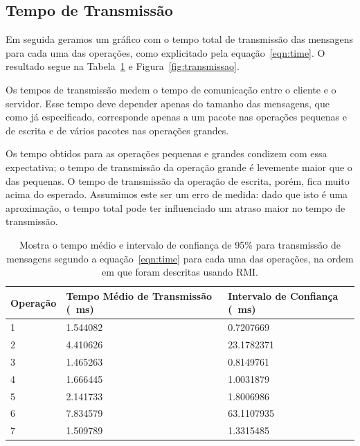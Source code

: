 \documentclass[12pt,a4paper]{article}
\begin{document}
\subsection{Tempo de Transmissão}

Em seguida geramos um gráfico com o tempo total de transmissão das mensagens para cada uma das operações, como explicitado pela equação~\ref{eqn:time}. O resultado segue na Tabela~\ref{table:transmissao} e Figura~\ref{fig:transmissao}.

Os tempos de transmissão medem o tempo de comunicação entre o cliente e o servidor. Esse tempo deve depender apenas do tamanho das mensagens, que como já especificado, corresponde apenas a um pacote nas operações pequenas e de escrita e de vários pacotes nas operações grandes. 

Os tempo obtidos para as operações pequenas e grandes condizem com essa expectativa; o tempo de transmissão da operação grande é levemente maior que o das pequenas. O tempo de transmissão da operação de escrita, porém, fica muito acima do esperado. Assumimos este ser um erro de medida: dado que isto é uma aproximação, o tempo total pode ter influenciado um atraso maior no tempo de transmissão.

\begin{table}[h]
\centering
\caption{Mostra o tempo médio e intervalo de confiança de 95\% para transmissão de mensagens segundo a equação~\ref{eqn:time} para cada uma das operações, na ordem em que foram descritas usando RMI.}
\label{table:transmissao}
\begin{tabular}{lll}
Operação & Tempo Médio de Transmissão (\SI{}{\milli\second}) & Intervalo de Confiança (\SI{}{\milli\second}) \\ \hline
1        & 1.544082             & 0.7207669      \\
2        & 4.410626             & 23.1782371     \\
3        & 1.465263             & 0.8149761      \\
4        & 1.666445             & 1.0031879      \\
5        & 2.141733             & 1.8006986       \\
6        & 7.834579             & 63.1107935     \\
7        & 1.509789             & 1.3315485     
\end{tabular}
\end{table}
\end{document}
